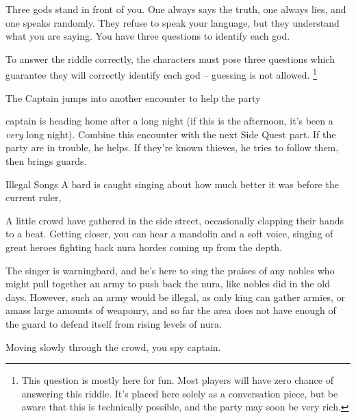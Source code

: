 \begin{multicols}{2}
\begin{boxtext}
Three gods stand in front of you.  One always says the truth, one always lies, and one speaks randomly.  They refuse to speak your language, but they understand what you are saying.  You have three questions to identify each god.
\end{boxtext}

To answer the riddle correctly, the characters must pose three questions which guarantee they will correctly identify each god -- guessing is not allowed.
\footnote{This question is mostly here for fun.  Most players will have zero chance of answering this riddle.
It's placed here solely as a conversation piece, but be aware that this is technically possible, and the party may soon be very rich.}

{\squash The Captain}%
{ jumps into another encounter to help the party}%

\captain

\Gls{captain} is heading home after a long night (if this is the afternoon, it's been a \emph{very} long night).
Combine this encounter with the next Side Quest part.
If the party are in trouble, he helps.
If they're known thieves, he tries to follow them, then brings guards.

{Illegal Songs}%
{A bard is caught singing about how much better it was before the current ruler, }%

\begin{boxtext}
  A little crowd have gathered in the side street, occasionally clapping their hands to a beat.
  Getting closer, you can hear a mandolin and a soft voice, singing of great heroes fighting back nura hordes coming up from the depth.
\end{boxtext}

The singer is \gls{warningbard}, and he's here to sing the praises of any nobles who might pull together an army to push back the nura, like nobles did in the old days.
However, such an army would be illegal, as only \gls{king} can gather armies, or amass large amounts of weaponry, and so far the area does not have enough of the \gls{guard} to defend itself from rising levels of nura.

\begin{boxtext}

  Moving slowly through the crowd, you spy \gls{captain}.

\end{boxtext}


\end{multicols}
